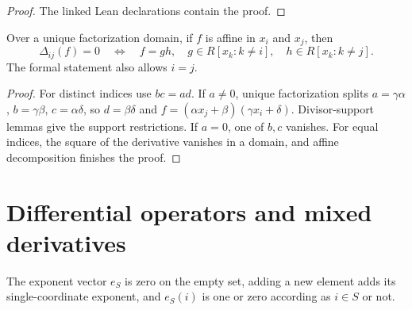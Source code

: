 \begin{proof}

\leanok

The linked Lean declarations contain the proof.

\end{proof}

\begin{lemma}

\label{lem:22}


\leanok


Over a unique factorization domain, if $f$ is affine in $x_i$ and $x_j$, then
\[ \Delta_{ij}(f)=0\quad\Longleftrightarrow\quad
 f=gh,\quad g\in R[x_k:k\ne i],\quad h\in R[x_k:k\ne j]. \]
The formal statement also allows $i=j$.

\end{lemma}

\begin{proof}

\leanok

For distinct indices use $bc=ad$. If $a\ne0$, unique factorization splits
$a=\gamma\alpha$, $b=\gamma\beta$, $c=\alpha\delta$, so $d=\beta\delta$ and
$f=(\alpha x_j+\beta)(\gamma x_i+\delta)$. Divisor-support lemmas give the support
restrictions. If $a=0$, one of $b,c$ vanishes. For equal indices, the square of the
derivative vanishes in a domain, and affine decomposition finishes the proof.

\end{proof}

\section{Differential operators and mixed derivatives}

\begin{lemma}

\label{lem:exponent-api}


\leanok


The exponent vector $e_S$ is zero on the empty set, adding a new element adds its
single-coordinate exponent, and $e_S(i)$ is one or zero according as $i\in S$ or not.

\end{lemma}

